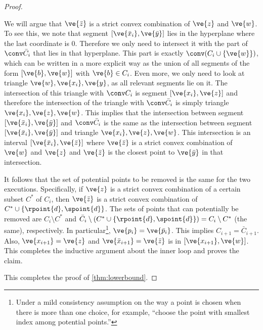 \begin{proof}
\begin{claimproof}
We will argue that $\ve{\bar z}$ is a strict convex combination of $\ve{z}$ and $\ve{w}$.
To see this, we note that segment $[\ve{\bar x_i}, \ve{\bar y}]$ lies in the hyperplane where the last coordinate is 0.
Therefore we only need to intersect it with the part of $\conv \bar C_i$ that lies in that hyperplane.
This part is exactly $\conv (C_i \cup \{\ve{w}\})$, which can be written in a more explicit way as the union of all segments of the form $[\ve{b},\ve{w}]$ with $\ve{b} \in C_i$.
Even more, we only need to look at triangle $\ve{w}, \ve{x_i}, \ve{y}$, as all relevant segments lie on it.
The intersection of this triangle with $\conv C_i$ is segment $[\ve{x_i}, \ve{z}]$ and therefore the intersection of the triangle with $\conv \bar C_i$ is simply triangle $\ve{x_i}, \ve{z}, \ve{w}$.
This implies that the intersection between segment $[\ve{\bar x_i}, \ve{\bar y}]$ and $\conv \bar C_i$ is the same as the intersection between  segment $[\ve{\bar x_i}, \ve{\bar y}]$ and triangle $\ve{x_i}, \ve{z}, \ve{w}$. 
This intersection is an interval $[\ve{\bar x_i}, \ve{\bar z}]$ where $\ve{\bar z}$ is a strict convex combination of $\ve{w}$ and $\ve{z}$ and $\ve{\bar z}$ is the closest point to $\ve{\bar y}$ in that intersection.

It follows that the set of potential points to be removed is the same for the two executions. 
Specifically, if $\ve{z}$ is a strict convex combination of a certain subset $C^*$ of $C_i$, then $\ve{\bar z}$ is a strict convex combination of $C^* \cup \{\rpoint{d}, \spoint{d}\}$.
The sets of points that can potentially be removed are $C_i \setminus C^*$ and $\bar C_i \setminus (C^* \cup \{\rpoint{d}, \spoint{d}\}) = C_i \setminus C^*$ (the same), respectively.
In particular\footnote{Under a mild consistency assumption on the way a point is chosen when there is more than one choice, for example, ``choose the point with smallest index among potential points.''}, $\ve{p_i} = \ve{\bar p_i}$.
This implies $C_{i+1} = \bar C_{i+1}$.
Also, $\ve{x_{i+1}} = \ve{z}$ and $\ve{\bar x_{i+1}} = \ve{\bar z}$ is in $[\ve{x_{i+1}}, \ve{w}]$.
This completes the inductive argument about the inner loop and proves the claim.
\end{claimproof}
This completes the proof of \cref{thm:lowerbound}.
\end{proof}

